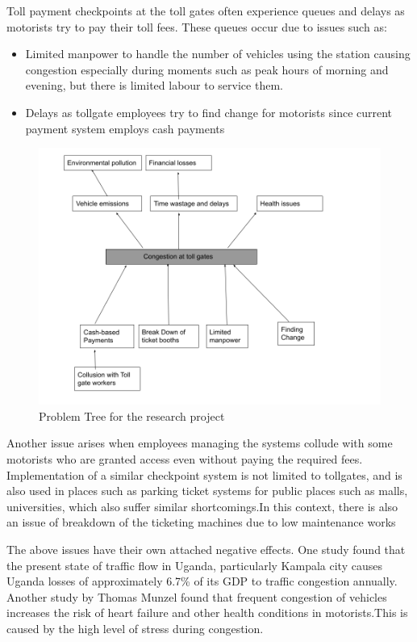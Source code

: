 Toll payment checkpoints at the toll gates often experience queues and delays as motorists try to pay their toll fees. These queues occur due to issues such as:
\begin{itemize}
    \item Limited manpower to handle the number of vehicles using the station causing congestion especially during moments such as peak hours of morning and evening, but there is limited labour to service them.
    \item Delays as tollgate employees try to find change for motorists since current payment system employs cash payments
\end{itemize}
\begin{figure}
    \begin{center}
        \includegraphics[scale = 0.5]{images/problem}
        \caption{Problem Tree for the research project}
    \end{center}
\end{figure}
Another issue arises when employees managing the systems collude with some motorists who are granted access even without paying the required fees. Implementation of a similar checkpoint system is not limited to tollgates, and is also used in places such as parking ticket systems for public places such as malls, universities\cite{bagadiong_car_2020}, which also suffer similar shortcomings.In this context, there is also an issue of breakdown of the ticketing machines due to low maintenance works

The above issues have their own attached negative effects. One study found that the present state of traffic flow in Uganda, particularly Kampala city causes Uganda losses of approximately 6.7\% of its GDP to traffic congestion annually. Another study by Thomas Munzel found that frequent congestion of vehicles increases the risk of heart failure and other health conditions in motorists.This is caused by the high level of stress during congestion\cite{munzel_environmental_2018}.

